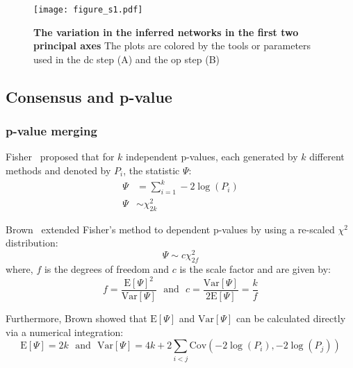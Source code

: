     \begin{figure}[H]
      \centering
      \texttt{[image: figure\_s1.pdf]}
    \end{figure}
    \begin{figure}[H]
      \centering
        \caption{
          \textbf{The variation in the inferred networks in the first two principal axes}
          The plots are colored by the tools or parameters used in the \ac{dc} step (A) and the \ac{op} step (B)
        }
      \label{fig:figure_s1}
    \end{figure}
    \FloatBarrier
    \newpage


  \subsection*{Consensus and p-value}

  \subsubsection*{p-value merging}
  Fisher~\cite{fisher_224a_1948} proposed that for $k$ independent p-values, each generated by $k$ different methods and denoted by $P_i$, the statistic $\Psi$:
  \begin{equation*}
    \begin{aligned}
        \Psi &= \sum_{i=1}^k -2 \log \left( P_i \right) \\
        \Psi &\sim \chi^2_{2k}
    \end{aligned}
  \end{equation*}

  Brown~\cite{brown_400_1975} extended Fisher's method to dependent p-values by using a re-scaled $\chi^2$ distribution:
  \begin{equation*}
    \Psi \sim c \chi^2_{2f}
  \end{equation*}
  where, $f$ is the degrees of freedom and $c$ is the scale factor and are given by:
  \begin{equation*}
    f = \frac{\mathrm{E}[\Psi]^2}{\mathrm{Var}[\Psi]} ~~~\text{and}~~~ c = \frac{\mathrm{Var}[\Psi]}{2\mathrm{E}[\Psi]} = \frac{k}{f}
  \end{equation*}

  Furthermore, Brown showed that $\mathrm{E}[\Psi]$ and $\mathrm{Var}[\Psi]$ can be calculated directly via a numerical integration:
  \begin{equation*}
    \mathrm{E}[\Psi] = 2k ~~~\text{and}~~~ \mathrm{Var}[\Psi] = 4k + 2\sum_{i<j} \mathrm{Cov}\left( -2\log(P_i), -2\log(P_j) \right)
  \end{equation*}

